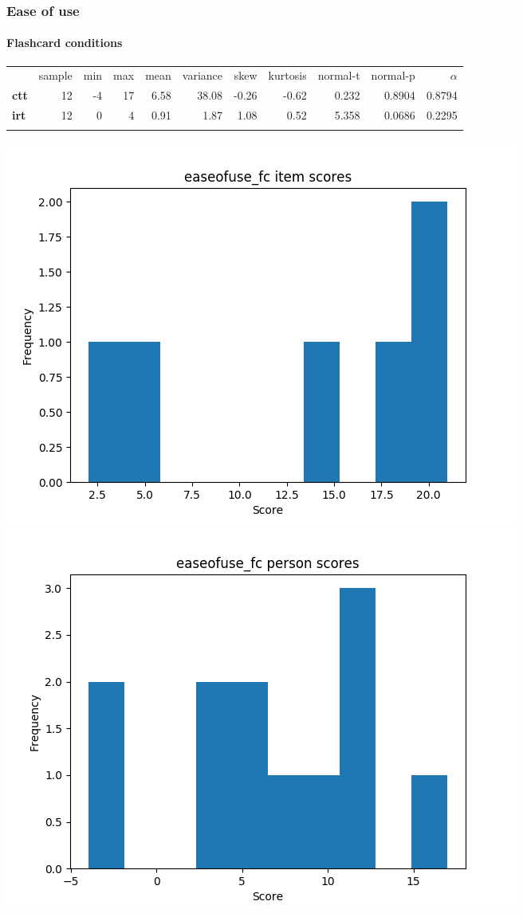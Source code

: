 \documentclass[]{article}
\begin{document}
\subsubsection{Ease of use}\label{ease-of-use}

\FloatBarrier
\paragraph{Flashcard conditions}\label{flashcard-conditions-6}

\begin{longtable}[c]{@{}lrrrrrrrrrr@{}}
\toprule\addlinespace
& sample & min & max & mean & variance & skew & kurtosis & normal-t &
normal-p & $\alpha$
\\\addlinespace
\midrule\endhead
\textbf{ctt} & 12 & -4 & 17 & 6.58 & 38.08 & -0.26 & -0.62 & 0.232 &
0.8904 & 0.8794
\\\addlinespace
\textbf{irt} & 12 & 0 & 4 & 0.91 & 1.87 & 1.08 & 0.52 & 5.358 & 0.0686 &
0.2295
\\\addlinespace
\bottomrule
\end{longtable}

\includegraphics{easeofuse_fc_diff.png}
\includegraphics{easeofuse_fc_abil.png}
\end{document}
